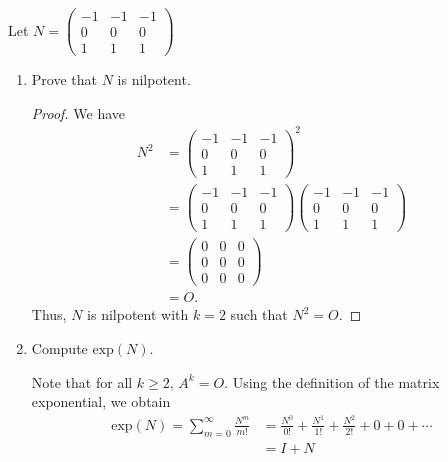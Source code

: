 \documentclass[a4paper]{article}
\begin{document}
\begin{problem}
    Let \( N = \displaystyle \begin{pmatrix}  - 1 &  - 1 &  -1 \\ 0 & 0 & 0 \\ 1 & 1 & 1  \end{pmatrix}  \)
    \begin{enumerate}
        \item Prove that \( N  \) is nilpotent.
            \begin{proof}
            We have 
            \begin{align*}
                N^{2} &= \begin{pmatrix} -1 & - 1 & - 1 \\ 0 & 0  & 0 \\ 1 & 1 & 1  \end{pmatrix}^{2}  \\
                      &=  \begin{pmatrix} -1 & - 1 & - 1 \\ 0 & 0  & 0 \\ 1 & 1 & 1  \end{pmatrix} \begin{pmatrix} -1 & - 1 & - 1 \\ 0 & 0  & 0 \\ 1 & 1 & 1  \end{pmatrix} \\
                      &= \begin{pmatrix}  0 & 0 & 0 \\ 0 & 0 & 0 \\ 0 & 0 & 0  \end{pmatrix} \\
                      &= O.
            \end{align*}
            Thus, \( N \) is nilpotent with \( k = 2  \) such that \( N^{2} = O  \).
            \end{proof}
        \item Compute \( \text{exp}(N) \).
            \begin{solution}
            Note that for all \( k \geq 2  \), \( A^{k} = O  \). Using the definition of the matrix exponential, we obtain 
            \begin{align*}
                \text{exp}(N)  = \sum_{ m = 0  }^{ \infty  } \frac{ N^{m} }{ m!  }  &= \frac{ N^{0} }{  0!  }  + \frac{ N^{1} }{ 1! }  + \frac{ N^{2} }{ 2! } + 0 + 0 + \cdots  \\
            &= I + N  \\

\end{align*}
\end{solution}
\end{enumerate}
\end{problem}
\end{document}
